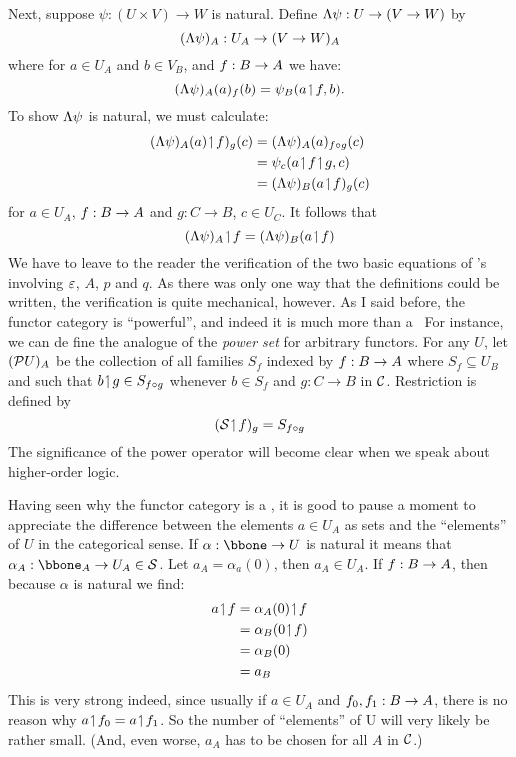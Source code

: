 Next, suppose $\psi: (U \times V) \to W$ is natural. Define
$\Lambda \psi  : U\rightarrow (V\rightarrow W)$ by
%
$$
(\Lambda \psi)_A: U_A \rightarrow (V \rightarrow W)_A
$$
%
where for $a \in U_A$ and $b \in V_B$, and $f: B \rightarrow A$ we have:
$$
(\Lambda \psi)_A (a)_f (b) = \psi_B (a \!\upharpoonleft\! f, b).
$$
To show $\Lambda\psi$ is natural, we must calculate:
\begin{align*}
(\L \psi)_A (a)\res f)_g (c) &= (\L \psi)_A(a)_{f \comp g} (c)\\
&= \psi_c(a \res f \res g,c)\\
&= (\L \psi)_B(a \res f)_g (c)
\end{align*}
%
for $a \in U_A$, $f : B \rightarrow A$ and $g: C\to B$, $c \in U_C$. It follows that
$$
(\Lambda \psi)_A \!\upharpoonleft\! f = (\Lambda \psi)_B (a \!\upharpoonleft\! f)
$$
%
We have to leave to the reader the verification of the two basic equations of \ccc's involving $\varepsilon$, $A$, $p$ and $q$. As there was only one way that the definitions could be written, the verification is quite mechanical, however.
As I said before, the functor category is ``powerful'', and indeed it is much more than a \ccc\  For instance, we can de fine the analogue of the {\it power set} for arbitrary functors. For any $U$, let $(\mathcal P U)_A$ be the collection of all families $S_f$ indexed by $f: B \rightarrow A$ where $S_f \subseteq U_B$ and such that $b\!\upharpoonleft\! g \in S_{f \circ g}$ whenever $b\in S_f$ and $g: C\to B$ in $\mathcal C$. Restriction is defined by
$$
(\mathcal S \!\upharpoonleft\! f)_g = S_{f \circ g}
$$
%
The significance of the power operator will become clear when we speak about higher-order logic.

Having seen why the functor category is a \ccc, it is good to pause a moment to appreciate the difference between the elements $a \in U_A$ as sets and the ``elements'' of $U$ in the categorical sense. If $\alpha : \bbone \to U$ is natural it means that $\alpha_A  : \bbone_A  \to U_A \in \S$. Let $a_A = \alpha_a(0)$, then $a_A \in U_A$. If $f:B \rightarrow A$, then because $\alpha$ is natural we find:
\begin{align*}
a \!\upharpoonleft\! f &= \alpha_A(0) \!\upharpoonleft\! f\\
&= \alpha_B(0 \!\upharpoonleft\! f)\\
&= \alpha_B(0)\\
&= a_B
\end{align*}
This is very strong indeed, since usually if $a \in U_A$ and $f_0, f_1 :B \rightarrow A$, there is no reason why $a \!\upharpoonleft\! f_0 = a \!\upharpoonleft\! f_1$.
So the number of ``elements'' of U will very likely be rather small. (And, even worse, $a_A$ has to be chosen for all $A$ in $\mathcal C$.)

